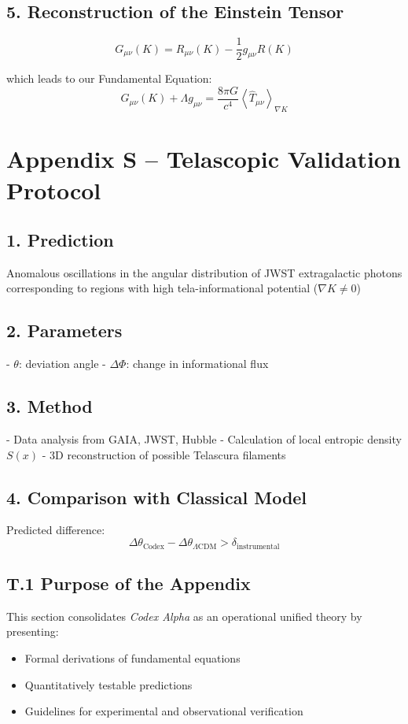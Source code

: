 \documentclass[12pt]{article}
\begin{document}
\subsection*{5. Reconstruction of the Einstein Tensor}
\[
G_{\mu\nu}(K) = R_{\mu\nu}(K) - \frac{1}{2} g_{\mu\nu} R(K)
\]

which leads to our Fundamental Equation:
\[
G_{\mu\nu}(K) + \Lambda g_{\mu\nu} = \frac{8\pi G}{c^4} \left\langle \hat{T}_{\mu\nu} \right\rangle_{\nabla K}
\]

\section*{Appendix S – Telascopic Validation Protocol}

\subsection*{1. Prediction}
Anomalous oscillations in the angular distribution of JWST extragalactic photons corresponding to regions with high tela-informational potential ($\nabla K \neq 0$)

\subsection*{2. Parameters}
- $\theta$: deviation angle  
- $\Delta \Phi$: change in informational flux

\subsection*{3. Method}
- Data analysis from GAIA, JWST, Hubble  
- Calculation of local entropic density $S(x)$  
- 3D reconstruction of possible Telascura filaments

\subsection*{4. Comparison with Classical Model}
Predicted difference:
\[
\Delta\theta_{\text{Codex}} - \Delta\theta_{\Lambda\text{CDM}} > \delta_{\text{instrumental}}
\]

\subsection*{T.1 Purpose of the Appendix}
This section consolidates \textit{Codex Alpha} as an operational unified theory by presenting:
\begin{itemize}
  \item Formal derivations of fundamental equations
  \item Quantitatively testable predictions
  \item Guidelines for experimental and observational verification
\end{itemize}
\end{document}
